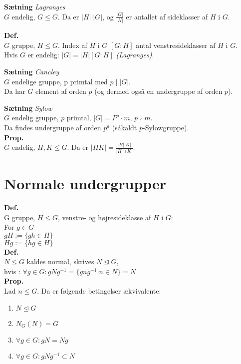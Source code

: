 \documentclass{article}
\begin{document}
\textbf{Sætning} \textit{Lagranges}\\
$G$ endelig, $G \leq G$. Da er $|H| | |G|$, og $\frac{|G|}{|H|}$ er antallet af sideklasser af $H$ i $G$.

\textbf{Def.}\\
$G$ gruppe, $H \leq G$. Index af $H$ i $G$ $[G:H]$ antal venstresideklasser af $H$ i $G$.\\
Hvis $G$ er endelig: $|G| = |H| [G:H]$ \textit{(Lagranges)}.

\textbf{Sætning} \textit{Cancley}\\
$G$ endelige gruppe, p primtal med $p \mid |G|$.\\
Da har $G$ element af orden $p$ (og dermed også en undergruppe af orden $p$).

\textbf{Sætning} \textit{Sylow}\\
$G$ endelig gruppe, $p$ primtal, $|G| = P^a \cdot m$, $p \nmid m$.\\
Da findes undergruppe af orden $p^a$ (såkaldt $p$-Sylowgruppe).\\

\textbf{Prop.}\\
$G$ endelig, $H, K \leq G$. Da er $|HK| = \frac{|H||K|}{|H \cap K|}$.

\section*{Normale undergrupper}
\textbf{Def.}\\
G gruppe, $H \leq G$, venstre- og højresideklasse af $H$ i $G$:\\
For $g \in G$\\
$gH := \{ gh \in H\}$\\
$Hg := \{ hg \in H\}$\\
\textbf{Def.}\\
$N \leq G$ kaldes normal, skrives $N \trianglelefteq G$,\\
hvis : $\forall{g \in G} : gNg^{-1} = \{ gng^{-1} | n \in N\} = N$\\
\textbf{Prop.}\\
Lad $n \leq G$. Da er følgende betingelser ækvivalente:
\begin{enumerate}
  \item $N \trianglelefteq G$
  \item $N_G(N) = G$
  \item $\forall{g \in G} : gN = Ng$
  \item $\forall{g \in G} : gNg^{-1} \subset N$
\end{enumerate}
\end{document}
